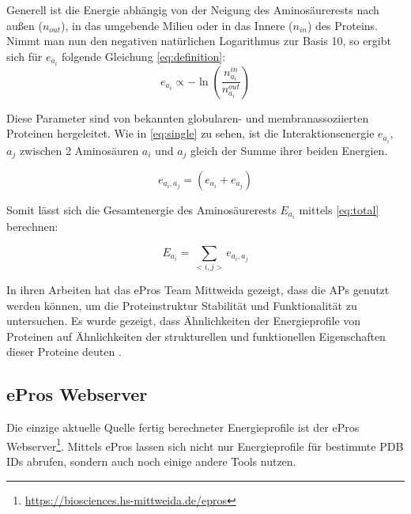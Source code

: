 Generell ist die Energie abhängig von der Neigung des Aminosäurerests nach außen ($n_{out}$), in das umgebende Milieu oder in das Innere ($n_{in}$) des Proteins. Nimmt man nun den negativen natürlichen Logarithmus zur Basis 10, so ergibt sich für $e_{a_i}$ folgende Gleichung \ref{eq:definition}:
%
\begin{equation}
  	e_{a_i} \propto -\ln{\left(\frac{n_{a_i}^{in}}{n_{a_i}^{out}}\right)}
  	\label{eq:definition}
\end{equation}

Diese Parameter sind von bekannten globularen- und membranassoziierten Proteinen hergeleitet. Wie in \ref{eq:single} zu sehen, ist die Interaktionsenergie $e_{a_{i}}$, $a_{j}$ zwischen 2 Aminosäuren $a_{i}$ und $a_{j}$ gleich der Summe ihrer beiden Energien. 

\begin{equation}
  	e_{a_{i},a_{j}} = \left( e_{a_{i}} + e_{a_{j}} \right)
    \label{eq:single}
\end{equation}

Somit lässt sich die Gesamtenergie des Aminosäurerests $E_{a_i}$ mittels \ref{eq:total} berechnen:

\begin{equation}
    E_{a_{i}} = \sum_{< i, j >}{e_{a_{i},a_{j}}}
    \label{eq:total}
\end{equation}

In ihren Arbeiten hat das ePros Team Mittweida gezeigt, dass die \ac{APs} genutzt werden können, um die Proteinstruktur Stabilität und Funktionalität zu untersuchen. Es wurde gezeigt, dass Ähnlichkeiten der Energieprofile von Proteinen auf Ähnlichkeiten der strukturellen und funktionellen Eigenschaften dieser Proteine deuten \cite{Heinke.2011}.


\subsection{ePros Webserver}
\label{sec:epros}
Die einzige aktuelle Quelle fertig berechneter Energieprofile ist der ePros Webserver\footnote{\url{https://biosciences.hs-mittweida.de/epros}}. Mittels ePros lassen sich nicht nur Energieprofile für bestimmte \ac{PDB} IDs abrufen, sondern auch noch einige andere Tools nutzen.


